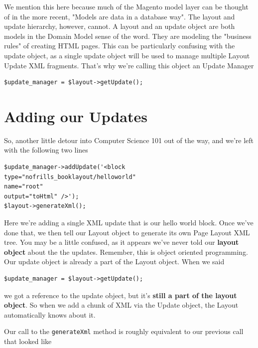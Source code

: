 \documentclass[oneside]{book}
\begin{document}
We mention this here because much of the Magento model layer can be thought of in the more recent, "Models are data in a database way".  The layout and update hierarchy, however, cannot.  A layout and an update object are both models in the Domain Model sense of the word.  They are modeling the "business rules" of creating HTML pages.  This can be particularly confusing with the update object, as a single update object will be used to manage multiple Layout Update XML fragments.  That's why we're calling this object an Update Manager

\begin{lstlisting}
$update_manager = $layout->getUpdate();

\end{lstlisting}


\section{Adding our Updates}

So, another little detour into Computer Science 101 out of the way, and we're left with the following two lines

\begin{lstlisting}
$update_manager->addUpdate('<block
type="nofrills_booklayout/helloworld"
name="root"
output="toHtml" />');
$layout->generateXml();

\end{lstlisting}


Here we're adding a single XML update that is our hello world block.  Once we've done that, we then tell our Layout object to generate its own Page Layout XML tree.  You may be a little confused, as it appears we've never told our \textbf{layout object} about the the updates. Remember, this is object oriented programming.  Our update object is already a part of the Layout object.  When we said

\begin{lstlisting}
$update_manager = $layout->getUpdate();

\end{lstlisting}


we got a reference to the update object, but it's \textbf{still a part of the layout object}.  So when we add a chunk of XML via the Update object, the Layout automatically knows about it.

Our call to the \footnotesize\texttt{generateXml} \normalsize  method is roughly equivalent to our previous call that looked like
\end{document}
